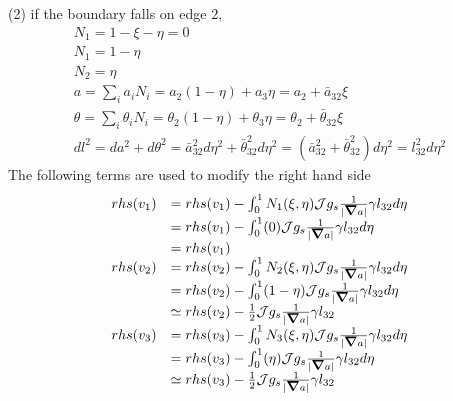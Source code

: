 \documentclass{report}
\newcommand{\bm}[1]{\mbox{\boldmath $#1$}}
\newcommand{\ff}[2]{\frac{#1}{#2}}
\begin{document}
(2) if the boundary falls on edge $2$,
$$
\begin{array}{l}
N_1=1-\xi-\eta=0\\
N_1=1-\eta\\
N_2=\eta\\
a = \sum_i a_i N_i = a_2(1-\eta) + a_3 \eta = a_2 + \bar{a}_{32} \xi\\
\theta = \sum_i \theta_i N_i = \theta_2(1-\eta) + \theta_3 \eta = \theta_2 + \bar{\theta}_{32} \xi\\
dl^2 = da^2 + d\theta^2 
     = \bar{a}_{32}^2 d\eta^2 + \bar{\theta}_{32}^2 d\eta^2
     = (\bar{a}_{32}^2 + \bar{\theta}_{32}^2) d\eta^2
     = l_{32}^2 d\eta^2
\end{array}
$$
The following terms are used to modify the right hand side
$$
\begin{array}{ll}
rhs(v_1) & = rhs(v_1) - \int_0^1 N_1(\xi,\eta) {\cal J} g_s \ff{1}{|\bm{\nabla}a|} \gamma l_{32} d\eta \\
         & = rhs(v_1) - \int_0^1 (0) {\cal J} g_s \ff{1}{|\bm{\nabla}a|} \gamma l_{32} d\eta \\
         & = rhs(v_1)
\\
rhs(v_2) & = rhs(v_2) - \int_0^1 N_2(\xi,\eta) {\cal J} g_s \ff{1}{|\bm{\nabla}a|} \gamma l_{32} d\eta \\
         & = rhs(v_2) - \int_0^1 (1-\eta) {\cal J} g_s \ff{1}{|\bm{\nabla}a|} \gamma l_{32} d\eta \\
         & \simeq rhs(v_2) - \ff{1}{2} {\cal J} g_s \ff{1}{|\bm{\nabla}a|} \gamma l_{32}
\\
rhs(v_3) & = rhs(v_3) - \int_0^1 N_3(\xi,\eta) {\cal J} g_s \ff{1}{|\bm{\nabla}a|} \gamma l_{32} d\eta \\
         & = rhs(v_3) - \int_0^1 (\eta) {\cal J} g_s \ff{1}{|\bm{\nabla}a|} \gamma l_{32} d\eta \\
         & \simeq rhs(v_3) - \ff{1}{2} {\cal J} g_s \ff{1}{|\bm{\nabla}a|} \gamma l_{32}
\end{array}
$$
\end{document}
